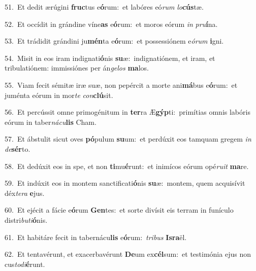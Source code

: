 {\numbfont\textcolor{\numbcolor}{51.}}~Et dedit ærúgini \textbf{fruc}\-tus e\-\textbf{ó}\-rum:~\star et labóres eó\textit{rum} \textit{lo}\-\textbf{cús}tæ.\par
{\numbfont\textcolor{\numbcolor}{52.}}~Et occídit in grándine víne\textbf{as} e\-\textbf{ó}\-rum:~\star et moros eórum \textit{in} \textit{pru}\-\textbf{í}na.\par
{\numbfont\textcolor{\numbcolor}{53.}}~Et trádidit grándini ju\-\textbf{mén}\-ta e\-\textbf{ó}\-rum:~\star et possessiónem e\-\textit{ó}\-\textit{rum} \textbf{i}\-gni.\par
{\numbfont\textcolor{\numbcolor}{54.}}~Misit in eos iram indignati\-\textbf{ó}\-nis \textbf{su}\-æ:~\star indignatiónem, et iram, et tribulatiónem: immissiónes per án\-\textit{ge}\-\textit{los} \textbf{ma}\-los.\par
{\numbfont\textcolor{\numbcolor}{55.}}~Viam fecit sémitæ iræ suæ, non pepércit a morte ani\-\textbf{má}\-bus e\-\textbf{ó}\-rum:~\star et juménta eórum in mor\textit{te} \textit{con}\-\textbf{clú}sit.\par
{\numbfont\textcolor{\numbcolor}{56.}}~Et percússit omne primogénitum in \textbf{ter}\-ra Æ\-\textbf{gýp}\-ti:~\star primítias omnis labóris eórum in taber\-\textit{ná}\-\textit{cu}\textbf{lis} Cham.\par
{\numbfont\textcolor{\numbcolor}{57.}}~Et ábstulit sicut oves \textbf{pó}\-pulum \textbf{su}\-um:~\star et perdúxit eos tamquam gregem \textit{in} \textit{de}\-\textbf{sér}to.\par
{\numbfont\textcolor{\numbcolor}{58.}}~Et dedúxit eos in spe, et non \textbf{ti}\-mu\-\textbf{é}\-runt:~\star et inimícos eórum opé\-\textit{ru}\-\textit{it} \textbf{ma}\-re.\par
{\numbfont\textcolor{\numbcolor}{59.}}~Et indúxit eos in montem sanctificati\-\textbf{ó}\-nis \textbf{su}\-æ:~\star montem, quem acquisívit déx\-\textit{te}\-\textit{ra} \textbf{e}\-jus.\par
{\numbfont\textcolor{\numbcolor}{60.}}~Et ejécit a fácie e\-\textbf{ó}\-rum \textbf{Gen}\-tes:~\star et sorte divísit eis terram in funículo distri\-\textit{bu}\-\textit{ti}\textbf{ó}nis.\par
{\numbfont\textcolor{\numbcolor}{61.}}~Et habitáre fecit in tabernácu\textbf{lis} e\-\textbf{ó}\-rum:~\star \textit{tri}\-\textit{bus} \textbf{Is}\-\textbf{ra}ël.\par
{\numbfont\textcolor{\numbcolor}{62.}}~Et tentavérunt, et exacerbavérunt \textbf{De}\-um ex\-\textbf{cél}\-sum:~\star et testimónia ejus non cus\-\textit{to}\-\textit{di}\textbf{é}runt.\par
